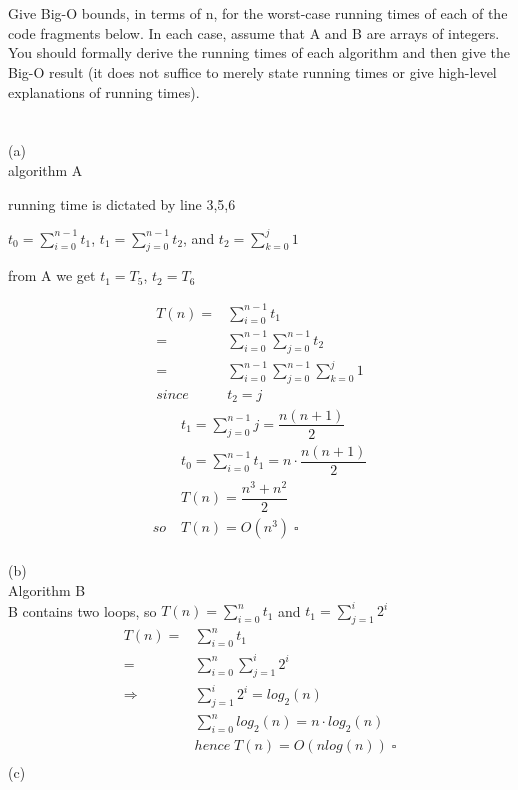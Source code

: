 \documentclass[12pt]{article}
\begin{document}
 
 

	
\section{}%
Give Big-O bounds, in terms of n, for the worst-case running times of each of the code
fragments below. In each case, assume that A and B are arrays of integers. You should
formally derive the running times of each algorithm and then give the Big-O result (it does
not suffice to merely state running times or give high-level explanations of running times).\\\\\\
(a)\\

algorithm A 

running time is dictated by line 3,5,6

  $t_0 = \sum_{i=0}^{n-1} t_1$,  $t_1 = \sum_{j=0}^{n-1} t_2$, and   $t_2 = \sum_{k=0}^{j} 1$ 

from A we get  $t_1 = T_5$, $t_2 = T_6$

\begin{align*}
 T(n) =&\sum_{i=0}^{n-1} t_1\\
 =&\sum_{i=0}^{n-1}\sum_{j=0}^{n-1} t_2 \\
 =&\sum_{i=0}^{n-1}\sum_{j=0}^{n-1} \sum_{k=0}^{j} 1 \\
 since \; &t_2  = j
\end{align*}
%
\begin{align*}
&t_1 = \sum_{j=0}^{n-1} j = \dfrac{n(n+1)}{2}\\
&t_0 =  \sum_{i=0}^{n-1} t_1 = n\cdot\dfrac{n(n+1)}{2}\\
&T(n) = \dfrac{n^3+n^2}{2}\\
so  \; &T(n) = O(n^3) \; \square
\end{align*}
\pagebreak[4]
\\%
(b)\\
Algorithm B\\
B contains two loops, so $T(n) = \sum_{i=0}^{n} t_1$ and $t_1 =\sum_{j=1}^{i} 2^i $\\
\begin{align*}
T(n) = &\sum_{i=0}^{n} t_1 \\
= &\sum_{i=0}^{n} \sum_{j=1}^{i} 2^i\\
\Rightarrow &\sum_{j= 1}^{i} 2^i = log_2(n)\\
&\sum_{i=0}^{n} log_2(n) = n \cdot log_2(n) \\
&hence \; T(n) = O(nlog(n)) \; \square\\
\end{align*}
(c)
\end{document}
